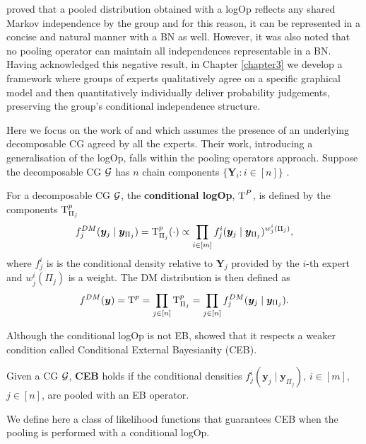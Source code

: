  \citet{Pennock2005} proved that a pooled distribution obtained with a logOp reflects any shared Markov independence by the group and for this reason, it can be represented in a concise and natural manner with a BN as well. However, it was also noted that no pooling operator can maintain all independences representable in a BN. Having acknowledged this negative result, in Chapter \ref{chapter3} we develop a framework where groups of experts qualitatively agree on a specific graphical model and then quantitatively individually deliver probability judgements, preserving the group's conditional independence structure. 
 
 Here we focus on the work of \citet{Faria1996} and \citet{Faria1997} which assumes the presence of an underlying decomposable CG agreed by all the experts. Their work, introducing a generalisation of the logOp, falls within the pooling operators approach. Suppose the decomposable CG $\mathcal{G}$ has $n$ chain components $\{\bm{Y}_i:i\in[n]\}$ .
 
\begin{definition}
For a decomposable CG $\mathcal{G}$, the \textbf{conditional logOp}, $\textnormal{T}^P$, is defined by the components $\textnormal{T}^p_{\Pi_j}$ 
\begin{equation*}
\label{eq:clogop}
f^{DM}_j(\bm{y}_j\;|\;\bm{y}_{\Pi_j})=\T^p_{\Pi_j}(\cdot)\propto \prod_{i\in[m]}f_{j}^i(\bm{y}_j\;|\; \bm{y}_{\Pi_j})^{w_{j}^i(\Pi_j)},
\end{equation*}
where $f_{j}^i$ is is the conditional density relative to $\bm{Y}_j$ provided by the $i$-th expert and $w_{j}^i(\Pi_j)$ is a weight. The DM distribution is then defined as
\begin{equation*}
f^{DM}(\bm{y})=\textnormal{T}^p=\prod_{j\in[n]}\textnormal{T}^p_{\Pi_j}=\prod_{j\in[n]}  f^{DM}_j(\bm{y}_j\;|\;\bm{y}_{\Pi_j}).
\end{equation*}
\end{definition}

Although the conditional logOp is not EB, \citet{Faria1997} showed that it respects a weaker condition called Conditional External Bayesianity (CEB). 

\begin{definition}
Given a CG $\mathcal{G}$, \textbf{CEB} holds if the conditional densities $f_{j}^i(\bm{y}_j\;|\; \bm{y}_{\Pi_j})$, $i\in[m]$, $j\in[n]$, are pooled with an EB operator.
\end{definition}

We define here a class of likelihood functions that guarantees CEB when the pooling is performed with a conditional logOp.

